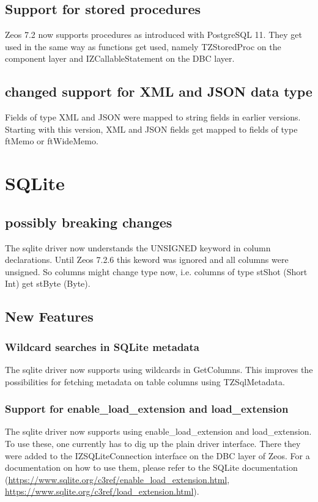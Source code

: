 \documentclass[a4paper,12pt,oneside]{book}
\begin{document}
\subsection{Support for stored procedures}

Zeos 7.2 now supports procedures as introduced with PostgreSQL 11.
They get used in the same way as functions get used, namely TZStoredProc on the component layer and IZCallableStatement on the DBC layer.

\subsection{changed support for XML and JSON data type}

Fields of type XML and JSON were mapped to string fields in earlier versions.
Starting with this version, XML and JSON fields get mapped to fields of type ftMemo or ftWideMemo.

\section{SQLite}

\subsection{possibly breaking changes}

The sqlite driver now understands the UNSIGNED keyword in column declarations.
Until Zeos 7.2.6 this keword was ignored and all columns were unsigned.
So columns might change type now, i.e. columns of type stShot (Short Int) get stByte (Byte).

\subsection{New Features}

\subsubsection{Wildcard searches in SQLite metadata}
The sqlite driver now supports using wildcards in GetColumns.
This improves the possibilities for fetching metadata on table columns using TZSqlMetadata.

\subsubsection{Support for enable\_load\_extension and load\_extension}
The sqlite driver now supports using enable\_load\_extension and load\_extension.
To use these, one currently has to dig up the plain driver interface.
There they were added to the IZSQLiteConnection interface on the DBC layer of Zeos.
For a documentation on how to use them, please refer to the SQLite documentation (\url{https://www.sqlite.org/c3ref/enable_load_extension.html}, \url{https://www.sqlite.org/c3ref/load_extension.html}).
\end{document}
